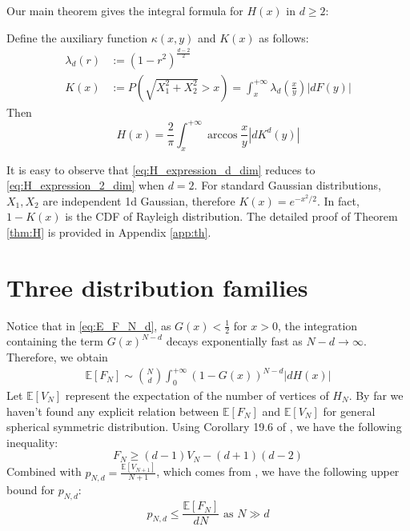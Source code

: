 \documentclass{aptpub}
\def\E{\mathbb{E}}
\begin{document}
Our main theorem gives the integral formula for $H(x)$ in $d\geq 2$:
\begin{theorem}\label{thm:H}
Define the auxiliary function $\kappa(x,y)$ and $K(x)$ as follows: 
     \begin{align}
          \lambda_d(r) & :=(1-r^2)^{\frac{d-2}{2}}
          \label{eq:lambda_r}\\
          K(x) &:=P(\sqrt{X_1^2+X_2^2}>x)=
          \int_x^{+\infty}
          \lambda_d \left(\frac{x}{y} \right)|dF(y)|
          \label{eq:K_x}
      \end{align}
Then
\begin{equation}
     H(x) = \frac{2}{\pi}
     \int_x^{+\infty} \arccos\frac{x}{y}
     |d K^d(y)|\label{eq:H_expression_d_dim}
\end{equation}
\end{theorem}
It is easy to observe that \eqref{eq:H_expression_d_dim} reduces to 
\eqref{eq:H_expression_2_dim} when $d=2$.
For standard Gaussian distributions, $X_1, X_2$ are independent 1d
Gaussian, therefore $K(x) = e^{-x^2/2}$. In fact, $1-K(x)$ is the CDF of Rayleigh distribution.
The detailed proof of Theorem \ref{thm:H}
is provided in Appendix \ref{app:th}.

\section{Three distribution families}\label{sec:three_distriutions}
Notice that in \eqref{eq:E_F_N_d}, as $G(x)<\frac{1}{2}$ for $x>0$, the integration containing the
term $G(x)^{N-d}$ decays exponentially fast as $N-d\to \infty$.
Therefore, we obtain
\begin{align}
     \E[F_N] \sim \binom{N}{d} \int_0^{+\infty} 
      (1-G(x))^{N-d} |dH(x)| 
     \label{eq:E_F_N_d_sim}
\end{align}
Let $\E[V_N]$ represent the expectation of the number of
vertices of $H_N$.
By far we haven't found any explicit relation between $\E[F_N]$ and $\E[V_N]$
for general spherical symmetric distribution.
Using Corollary 19.6 of \cite{brondsted2012introduction}, we have the following
inequality:
\begin{equation}\label{eq:F_V_upper}
     F_N \geq (d-1) V_N - (d+1)(d-2)
 \end{equation}
Combined with $p_{N,d} = \frac{\E[V_{N+1}]}{N+1}$, which comes from
\cite{efron1965convex}, we have the following upper bound for $p_{N,d}$:
\begin{equation}\label{eq:p_N_d_bound}
    p_{N,d} \leq \frac{\E[F_N]}{d N} \textrm{ as } N \gg d
\end{equation}
\end{document}
